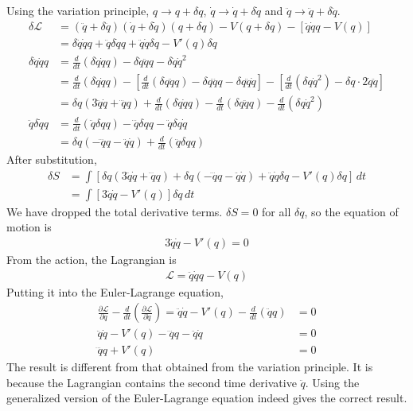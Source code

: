 \documentclass[12pt]{book} %
\numberwithin{equation}{chapter}
\def\d{\delta}
\def\La{\mathcal{L}}
\def\p{\partial}
\begin{document}
\begin{solbox}
Using the variation principle, $q\to q+\d q$, $\dot{q}\to \dot{q}+\d \dot{q}$ and $\ddot{q}\to \ddot{q}+\d\ddot{q}$.
\begin{align*}
\d \La&=\left(\ddot{q}+\d\ddot{q}\right)\left(\dot{q}+\d\dot{q}\right)\left(q+\d q\right)-V(q+\d q)-\left[\ddot{q}\dot{q}q-V(q)\right]\\
&=\d\ddot{q}\dot{q}q+\ddot{q}\d\dot{q}q+\ddot{q}\dot{q}\d q-V'(q)\d q\\
\d \ddot{q}\dot{q}q&=\frac{d}{dt}\left(\d\dot{q}\dot{q}q\right)-\d\dot{q}\ddot{q}q-\d\dot{q}\dot{q}^{2}\\
&=\frac{d}{dt}\left(\d\dot{q}\dot{q}q\right)-\left[\frac{d}{dt}\left(\d q\ddot{q}q\right)-\d q \dddot{q} q-\d q\ddot{q}\dot{q}\right]-\left[\frac{d}{dt}\left(\d q\dot{q}^{2}\right)-\d q\cdot2\dot{q}\ddot{q}\right]\\
&=\d q\left(3\ddot{q}\dot{q}+\dddot{q}q\right)+\frac{d}{dt}\left(\d\dot{q}\dot{q}q\right)-\frac{d}{dt}\left(\d q\ddot{q}q\right)-\frac{d}{dt}\left(\d q\dot{q}^{2}\right)\\
\ddot{q}\d \dot{q}q&=\frac{d}{dt}\left(\ddot{q}\d q q\right)-\dddot{q}\d q q-\ddot{q}\d q\dot{q}\\
&=\d q\left(-\dddot{q}q-\ddot{q}\dot{q}\right)+\frac{d}{dt}\left(\ddot{q}\d q q\right)
\end{align*}
After substitution,
\begin{align*}
\d S&=\int\left[\d q\left(3\ddot{q}\dot{q}+\dddot{q}q\right)+\d q\left(-\dddot{q}q-\ddot{q}\dot{q}\right)+\ddot{q}\dot{q}\d q-V'(q)\d q\right]\,dt\\
&=\int\left[3\ddot{q}\dot{q}-V'(q)\right]\d q\,dt
\end{align*}
We have dropped the total derivative terms. $\d S=0$ for all $\d q$, so the equation of motion is
\begin{align*}
3\ddot{q}\dot{q}-V'(q)=0
\end{align*}
From the action, the Lagrangian is
\begin{align*}
\La=\ddot{q}\dot{q}q-V(q)
\end{align*}
Putting it into the Euler-Lagrange equation,
\begin{align*}
\frac{\p \La}{\p q}-\frac{d}{dt}\left(\frac{\p \La}{\p \dot{q}}\right)=\ddot{q}\dot{q}-V'(q)-\frac{d}{dt}\left(\ddot{q}q\right)&=0\\
\ddot{q}\dot{q}-V'(q)-\dddot{q}q-\ddot{q}\dot{q}&=0\\
\dddot{q}q+V'(q)&=0
\end{align*}
The result is different from that obtained from the variation principle. It is because the Lagrangian contains the second time derivative $\ddot{q}$. Using the generalized version of the Euler-Lagrange equation indeed gives the correct result.
\end{solbox}
\end{document}
